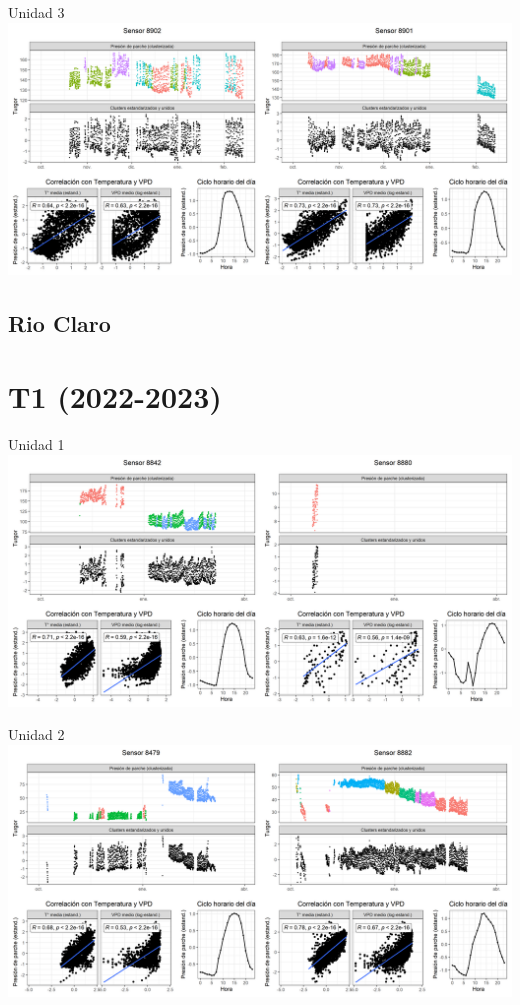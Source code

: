 \documentclass[
  letterpaper,
  DIV=11,
  numbers=noendperiod]{scrreprt}
\begin{document}
Unidad 3
\includegraphics{figuras/03_turgor_union/2023_2024_La_Esperanza_T4_Unidad_3.png}

\section{Rio Claro}\label{rio-claro-3}

\chapter{T1 (2022-2023)}

Unidad 1
\includegraphics{figuras/03_turgor_union/2022_2023_Rio_Claro_T1_Unidad_1.png}

Unidad 2
\includegraphics{figuras/03_turgor_union/2022_2023_Rio_Claro_T1_Unidad_2.png}
\end{document}
